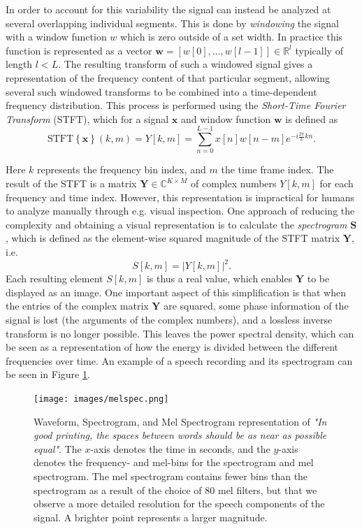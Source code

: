 \documentclass{report}
\begin{document}
In order to account for this variability the signal can instead be analyzed at several overlapping individual segments. This is done by \textit{windowing} the signal with a window function $w$ which is zero outside of a set width. In practice this function is represented as a vector $\bm{w}=[w[0],\dots, w[l-1]] \in \mathbb{R}^l$ typically of length $l<L$. The resulting transform of such a windowed signal gives a representation of the frequency content of that particular segment, allowing several such windowed transforms to be combined into a time-dependent frequency distribution. This process is performed using the \textit{Short-Time Fourier Transform} (STFT), which for a signal $\bm{x}$ and window function $\bm{w}$ is defined as
\begin{equation} \label{eq:spec}
    \text{STFT}\left\{ \bm{x} \right\}(k, m) = Y[k, m] = \sum_{n=0}^{L-1} x[n]w[n-m]e^{-i \frac{2\pi}{L}k n}.
\end{equation}

Here $k$ represents the frequency bin index, and $m$ the time frame index. The result of the STFT is a matrix $\bm{Y} \in \mathbb{C}^{K \times M}$ of complex numbers $Y[k, m]$ for each frequency and time index. However, this representation is impractical for humans to analyze manually through e.g. visual inspection. One approach of reducing the complexity and obtaining a visual representation is to calculate the \textit{spectrogram} $\bm{S}$, which is defined as the element-wise squared magnitude of the STFT matrix $\bm{Y}$, i.e.
\begin{equation}
    S[k, m] = \left| Y[k, m] \right|^2.
\end{equation}
Each resulting element $S[k, m]$ is thus a real value, which enables $\bm{Y}$ to be displayed as an image. One important aspect of this simplification is that when the entries of the complex matrix $\bm{Y}$ are squared, some phase information of the signal is lost (the arguments of the complex numbers), and a lossless inverse transform is no longer possible. This leaves the power spectral density, which can be seen as a representation of how the energy is divided between the different frequencies over time. An example of a speech recording and its spectrogram can be seen in Figure \ref{fig:melspec}.

\begin{figure}[H]
    \centering
    \texttt{[image: images/melspec.png]}
    \caption{\onehalfspacing Waveform, Spectrogram, and Mel Spectrogram representation of  \textit{"In good printing, the spaces between words should be as near as possible equal"}. The $x$-axis denotes the time in seconds, and the $y$-axis denotes the frequency- and mel-bins for the spectrogram and mel spectrogram. The mel spectrogram contains fewer bins than the spectrogram as a result of the choice of 80 mel filters, but that we observe a more detailed resolution for the speech components of the signal. A brighter point represents a larger magnitude.}
    \label{fig:melspec}
\end{figure}
\end{document}
